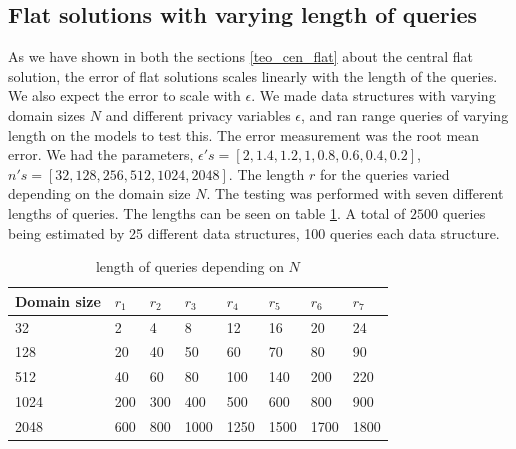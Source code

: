 \documentclass[11pt]{article}
\theoremstyle{definition}
\begin{document}
\subsection{Flat solutions with varying length of queries}
As we have shown in both the sections \ref{teo_cen_flat} about the central flat solution, the error of flat solutions scales linearly with the length of the queries. We also expect the error to scale with $\epsilon$. We made data structures with varying domain sizes $N$ and different privacy variables $\epsilon$, and ran range queries of varying length on the models to test this. The error measurement was the root mean error. 
We had the parameters, $\epsilon's = [2, 1.4, 1.2, 1, 0.8, 0.6, 0.4, 0.2]$, $n's = [32, 128, 256, 512, 1024, 2048]$. The length $r$ for the queries varied depending on the domain size $N$. The testing was performed with seven different lengths of queries. The lengths can be seen on table \ref{tab:cen_flat_r}. A total of $2500$ queries being estimated by 25 different data structures, 100 queries each data structure.
\begin{table}[H]
\centering
\begin{tabular}{|l|l|l|l|l|l|l|l|}
\hline
Domain size    & $r_1$ & $r_2$ & $r_3$ & $r_4$ & $r_5$ & $r_6$ & $r_7$\\ \hline
32   & 2        & 4        & 8        & 12       & 16       & 20       & 24       \\ \hline
128  & 20       & 40       & 50       & 60       & 70       & 80       & 90       \\ \hline
512  & 40       & 60       & 80       & 100      & 140      & 200      & 220      \\ \hline
1024 & 200      & 300      & 400      & 500      & 600      & 800      & 900      \\ \hline
2048 & 600      & 800      & 1000     & 1250     & 1500     & 1700     & 1800     \\ \hline
\end{tabular}
\caption{length of queries depending on $N$}
  \label{tab:cen_flat_r}
\end{table}
\end{document}
